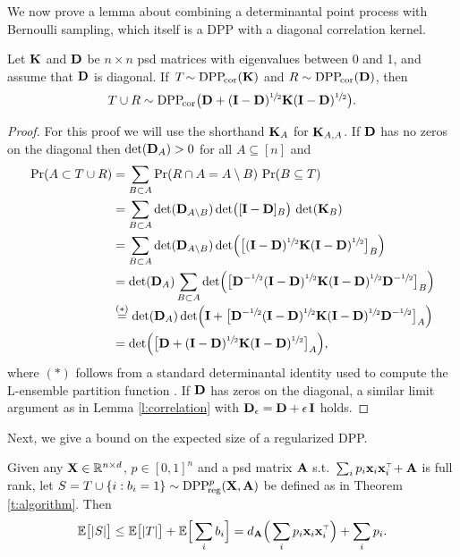 \documentclass[11pt]{article}
\begin{document}
We now prove a lemma about combining a determinantal point process
with Bernoulli sampling, which itself is a DPP with a diagonal correlation
kernel.
\begin{lemma}
  Let $\mathbf K$ and $\mathbf D$ be $n\times n$ psd matrices with eigenvalues between
0 and 1, and assume that $\mathbf D$ is diagonal. If\, $T\!\sim{{\mathrm{DPP}}_{\!\mathrm{cor}}}(\mathbf K)$ and
$R\sim{{\mathrm{DPP}}_{\!\mathrm{cor}}}(\mathbf D)$, then
\begin{align*}T\cup R\sim {{\mathrm{DPP}}_{\!\mathrm{cor}}}\big(\mathbf D+(\mathbf I-\mathbf D)^{\sfrac12}\mathbf K
  (\mathbf I-\mathbf D)^{\sfrac12}\big).
  \end{align*}
\end{lemma}
\begin{proof}
For this proof we will use the shorthand $\mathbf K_A$ for $\mathbf K_{A,A}$. If
$\mathbf D$ has no zeros on the diagonal then $\det(\mathbf D_A)>0$ for all
$A\subseteq[n]$ and
  \begin{align*}
    \mathrm{Pr}(A \subset T \cup R)
    &=\sum_{B\subset A}\mathrm{Pr}(R\cap A=A\setminus B) \ \mathrm{Pr}(B\subseteq T)\\
    &=\sum_{B\subset A}\det(\mathbf D_{A\setminus
      B})\det\!\big([\mathbf I-\mathbf D]_B\big)\,\det(\mathbf K_B) \\
    &=\sum_{B\subset A}\det(\mathbf D_{A\setminus
      B})\det\!\Big(\big[(\mathbf I-\mathbf D)^{\sfrac12}\mathbf K(\mathbf I-\mathbf D)^{\sfrac12}\big]_B\Big) \\
    &=\det(\mathbf D_A) \sum_{B\subset A}\det\!\Big(\big[\mathbf D^{-\sfrac12}
      (\mathbf I-\mathbf D)^{\sfrac12}\mathbf K(\mathbf I-\mathbf D)^{\sfrac12}\mathbf D^{-\sfrac12}\big]_{B}\Big)\\[-1mm]
    &\overset{(*)}{=}\det(\mathbf D_A)\det\!\Big(\mathbf I + \big[\mathbf D^{-\sfrac12}
      (\mathbf I-\mathbf D)^{\sfrac12}\mathbf K(\mathbf I-\mathbf D)^{\sfrac12}\mathbf D^{-\sfrac12}\big]_A\Big)\\
    &=\det\!\Big(\big[\mathbf D+ (\mathbf I-\mathbf D)^{\sfrac12}\mathbf K(\mathbf I-\mathbf D)^{\sfrac12}\big]_A\Big),
  \end{align*}
  where $(*)$ follows from a standard determinantal identity used to
  compute the L-ensemble partition function
  \cite[Theorem~2.1]{dpp-ml}. If $\mathbf D$ has zeros on the diagonal, a
  similar limit argument as in Lemma \ref{l:correlation} with
  $\mathbf D_\epsilon=\mathbf D+\epsilon\,\mathbf I$ holds.
\end{proof}
Next, we give a bound on the expected size of a regularized DPP.
\begin{lemma}
  Given any $\mathbf X\in\mathbb R^{n\times d}$, $p\in[0,1]^n$ and a psd matrix $\mathbf A$
  s.t.~$\sum_ip_i\x_i\x_i^\top\!+\A$ is
  full rank, let $S=T\cup \{i:b_i=1\}\sim {{\mathrm{DPP}}_{\!\mathrm{reg}}^{p}}(\mathbf X,\mathbf A)$ be defined
as in Theorem \ref{t:algorithm}. Then
\begin{align*}
\E\big[|S|\big]\leq \E\big[|T|\big] + \E\Big[\sum_i b_i\Big] =
  d_{\A}\Big(\sum_ip_i\x_i\x_i^\top\Big) + \sum_i  p_i.
\end{align*}
\end{lemma}
\end{document}
